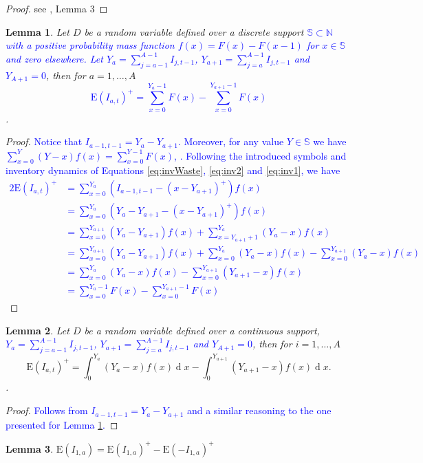 \documentclass{tPRS2e}
\renewcommand{\d}[1]{\ensuremath{\operatorname{d}\!{#1}}}
\newcommand{\blue}{\textcolor{blue}}
\newtheorem{lem}{Lemma}
\begin{document}
	\begin{proof}
		see \cite{citeulike:13075114}, Lemma 3
	\end{proof}
%	
	\begin{lem}\label{lem:age_expectation_disc}
		Let $D$ be a random variable defined over a discrete support \blue{$\mathbb{S}\subset \mathbb N$ with a positive probability mass function $f(x)=F(x)-F(x-1)$ for $x\in\mathbb S$ and zero elsewhere. Let $Y_a=\sum_{j=a-1}^{A-1} I_{j,t-1}$, $Y_{a+1}=\sum_{j=a}^{A-1} I_{j,t-1}$ and $Y_{A+1}=0$}, then for $a=1,\ldots,A$ \blue{
		\[\mathrm{E}(I_{a,t})^+=\sum_{x=0}^{Y_a-1}F(x)-\sum_{x=0}^{Y_{a+1}-1}F(x)\]
		}.
	\end{lem}
	\begin{proof} \blue{ Notice that $I_{a-1,t-1}=Y_a-Y_{a+1}$. Moreover, for any value $Y\in \mathbb S$ we have $\sum_{x=0}^Y (Y-x) f(x) = \sum_{x=0}^{Y-1} F(x)$, \cite{citeulike:13075114}. Following the introduced symbols and inventory dynamics of Equations \eqref{eq:invWaste}, \eqref{eq:inv2} and \eqref{eq:inv1}, we have
		\begin{alignat}{2}
			\mathrm{E}(I_{a,t})^+
			&=\sum_{x=0}^{Y_a}(I_{a-1,t-1}-(x-Y_{a+1})^+)f(x)\nonumber\\
			&=\sum_{x=0}^{Y_a}(Y_a-Y_{a+1}-(x-Y_{a+1})^+)f(x)\nonumber\\
			&=\sum_{x=0}^{Y_{a+1}}(Y_a-Y_{a+1})f(x)+\sum_{x=Y_{a+1}+1}^{Y_a}(Y_{a}-x)f(x)\nonumber\\
			&=\sum_{x=0}^{Y_{a+1}}(Y_a-Y_{a+1})f(x)+\sum_{x=0}^{Y_a}(Y_a-x)f(x)-\sum_{x=0}^{Y_{a+1}}(Y_{a}-x)f(x)\nonumber\\
			&=\sum_{x=0}^{Y_a}(Y_a-x)f(x)-\sum_{x=0}^{Y_{a+1}}(Y_{a+1}-x)f(x)\nonumber\\
			&=\sum_{x=0}^{Y_a-1}F(x)-\sum_{x=0}^{Y_{a+1}-1}F(x)\nonumber
		\end{alignat}}
	\end{proof}
%	
	\begin{lem}
		Let $D$ be a random variable defined over a continuous support, \blue{$Y_a=\sum_{j=a-1}^{A-1} I_{j,t-1}$, $Y_{a+1}=\sum_{j=a}^{A-1} I_{j,t-1}$ and $Y_{A+1}=0$}, then for $i=1,\ldots,A$
		\[\mathrm{E}(I_{a,t})^+=\int_0^{Y_a}(Y_a-x)f(x)\d x-\int_0^{Y_{a+1}}(Y_{a+1}-x)f(x)\d x .\]. 
	\end{lem}
	\begin{proof}
	\blue{Follows from $I_{a-1,t-1}=Y_a-Y_{a+1}$ and a similar reasoning  to the one presented for Lemma \ref{lem:age_expectation_disc}.}
	\end{proof}
%	
	\begin{lem}
		$\mathrm{E}(I_{1,a})=\mathrm{E}(I_{1,a})^+ -\mathrm{E}(-I_{1,a})^+$
	\end{lem}
\end{document}
